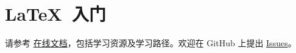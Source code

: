 \section{\LaTeX\ 入门}
请参考 \href{https://tex.readthedocs.io/zh_CN/latest/}{在线文档}，包括学习资源及学习路径。欢迎在 GitHub 上提出 \href{https://github.com/Iydon/tex/issues}{Issues}。
